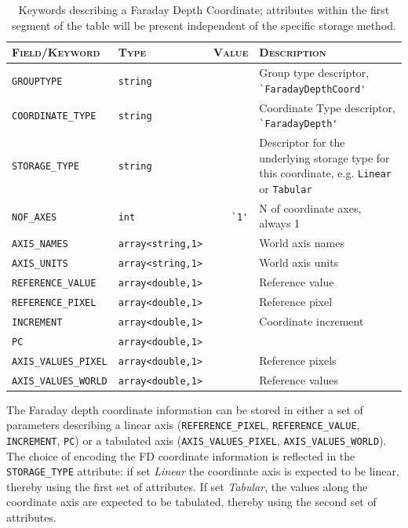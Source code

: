 \documentclass[a4paper,10pt,bibtotoc]{scrartcl}
\begin{document}
\begin{table}[h]
  \centering
  \begin{tabular}{|llrp{8cm}|}
    \hline
                      \textsc{Field/Keyword} & \textsc{Type}  & \textsc{Value}& \textsc{Description} \\
    \hline \hline
    \small{\verb|GROUPTYPE|}             & \verb|string| & &Group type descriptor,  \verb|`FaradayDepthCoord'| \\
    \small{\verb|COORDINATE_TYPE|} & \verb|string| & &Coordinate Type descriptor,  \verb|`FaradayDepth'|\\
    \small{\verb|STORAGE_TYPE|}       & \verb|string| & &Descriptor for the underlying storage type for this coordinate, e.g. \texttt{Linear}
    or \texttt{Tabular} \\
    \small{\verb|NOF_AXES|}     & \verb|int|                         & \verb|`1'|& N of coordinate axes, always 1 \\
    \small{\verb|AXIS_NAMES|} & \verb|array<string,1>| &                    &World axis names \\
    \small{\verb|AXIS_UNITS|} & \verb|array<string,1>| &                    &World axis units \\
    \hline \hline
    \small{\verb|REFERENCE_VALUE|} & \verb|array<double,1>| &          &Reference value \\
    \small{\verb|REFERENCE_PIXEL|} & \verb|array<double,1>| &          &Reference pixel \\
    \small{\verb|INCREMENT|}             & \verb|array<double,1>| &          &Coordinate increment \\
    \small{\verb|PC|} & \verb|array<double,1>| &                                    & \\
    \hline \hline
    \small{\verb|AXIS_VALUES_PIXEL|} & \verb|array<double,1>| &      &Reference pixels \\
    \small{\verb|AXIS_VALUES_WORLD|} & \verb|array<double,1>| &      &Reference values \\
    \hline
  \end{tabular}
  \caption[Keywords describing the Faraday Depth Coordinate]{Keywords describing a Faraday Depth Coordinate; attributes within the first segment of the table will be present independent of the specific storage method.}
  \label{tab:coord-farad}
\end{table}
 
The Faraday depth coordinate information can be stored in either a set of parameters describing a linear axis (\verb|REFERENCE_PIXEL|, \verb|REFERENCE_VALUE|, \verb|INCREMENT|, \verb|PC|) or a tabulated axis (\verb|AXIS_VALUES_PIXEL|, \verb|AXIS_VALUES_WORLD|). The choice of encoding the FD coordinate information is reflected in the \verb|STORAGE_TYPE| attribute: if set \textsl{Linear} the coordinate axis is expected to be linear, thereby using the first set of attributes. If set \textsl{Tabular}, the values along the coordinate axis are expected to be tabulated, thereby using the second set of attributes.
\end{document}
